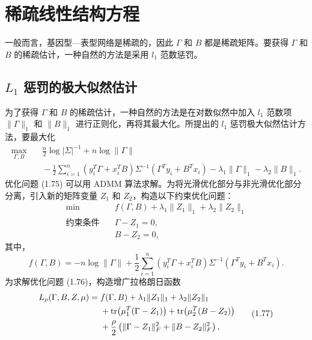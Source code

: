 \section{稀疏线性结构方程}
\label{sec:ch01b-sparse-sem}

一般而言，基因型—表型网络是稀疏的，因此 $\Gamma$ 和 $B$ 都是稀疏矩阵。要获得 $\Gamma$ 和 $B$ 的稀疏估计，一种自然的方法是采用 $l_1$ 范数惩罚。

\subsection{\texorpdfstring{$L_1$}{L1} 惩罚的极大似然估计}
\label{sec:ch01b-l1-ml}

为了获得 $\Gamma$ 和 $B$ 的稀疏估计，一种自然的方法是在对数似然中加入 $l_1$ 范数项 $\lVert\Gamma\rVert_1$ 和 $\lVert B\rVert_1$ 进行正则化，再将其最大化。所提出的 $l_1$ 惩罚极大似然估计方法，要最大化
\begin{equation}
 \begin{aligned}
 \max_{\Gamma,B}\quad&
 \frac n2\log|\Sigma|^{-1}+n\log\lVert\Gamma\rVert\\
 &{}-\frac12\sum_{i=1}^{n}(y_i^{T}\Gamma+x_i^{T}B)\Sigma^{-1}
       (\Gamma^{T}y_i+B^{T}x_i)
       -\lambda_1\lVert\Gamma\rVert_1-\lambda_2\lVert B\rVert_1.
 \end{aligned}
 \tag{1.75}
\end{equation}
优化问题 (1.75) 可以用 ADMM 算法求解。为将光滑优化部分与非光滑优化部分分离，引入新的矩阵变量 $Z_1$ 和 $Z_2$，构造以下约束优化问题：
\begin{equation}
 \begin{aligned}
 \min\quad&f(\Gamma,B)+\lambda_1\lVert Z_1\rVert_1
                          +\lambda_2\lVert Z_2\rVert_1\\
 \text{约束条件}\quad&\Gamma-Z_1=0,\\
                     &B-Z_2=0,
 \end{aligned}
 \tag{1.76}
\end{equation}
其中，
\[
 f(\Gamma,B)=-n\log\lVert\Gamma\rVert
 +\frac12\sum_{i=1}^{n}(y_i^{T}\Gamma+x_i^{T}B)\Sigma^{-1}
       (\Gamma^{T}y_i+B^{T}x_i).
\]
为求解优化问题 (1.76)，构造增广拉格朗日函数
\begin{equation}
 \begin{aligned}
 L_\rho(\Gamma,B,Z,\mu)
 ={}&f(\Gamma,B)+\lambda_1\lVert Z_1\rVert_1
                 +\lambda_2\lVert Z_2\rVert_1\\
 &{}+\operatorname{tr}\bigl(\mu_1^{T}(\Gamma-Z_1)\bigr)
       +\operatorname{tr}\bigl(\mu_2^{T}(B-Z_2)\bigr)\\
 &{}+\frac\rho2\left(\lVert\Gamma-Z_1\rVert_F^2
                       +\lVert B-Z_2\rVert_F^2\right),
 \end{aligned}
 \tag{1.77}
\end{equation}
